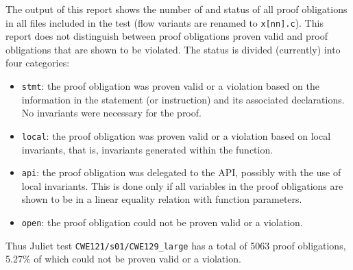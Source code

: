 \documentclass[11pt]{article}
\begin{document}
The output of this report shows the number of and status of all proof obligations
in all files included in the test (flow variants are renamed to {\tt x[nn].c}). This report
does not distinguish between proof obligations proven valid and proof obligations
that are shown to be violated. The status
is divided (currently) into four categories:
\begin{itemize}
\item {\tt stmt}: the proof obligation was proven valid or a violation based on the
   information in the statement (or instruction) and its associated declarations.
   No invariants were necessary for the proof.
\item {\tt local}: the proof obligation was proven valid or a violation based on 
   local invariants, that is, invariants generated within the function.
\item {\tt api}: the proof obligation was delegated to the API, possibly with the use
   of local invariants. This is done only if all variables in the proof obligations
   are shown to be in a linear equality relation with function parameters.
\item {\tt open}: the proof obligation could not be proven valid or a violation.
\end{itemize}
Thus Juliet test {\tt CWE121/s01/CWE129\_large} has a total of 5063 proof obligations, 5.27\%
of which could not be proven valid or a violation.
\end{document}
